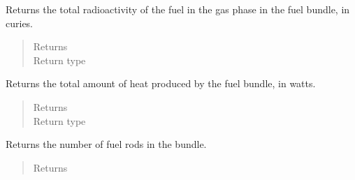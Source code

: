 \documentclass[letterpaper,10pt,openany,oneside,english]{sphinxmanual}
\begin{document}
\begin{fulllineitems}
\begin{fulllineitems}
\label{\detokenize{support_rst/fuel_bundle:fuel_bundle.FuelBundle.get_gas_radioactivity}}
Returns the total radioactivity of the fuel in the gas phase in the
fuel bundle, in curies.
\begin{quote}\begin{description}
\item[{Returns}] \leavevmode
{}

\item[{Return type}] \leavevmode
{}

\end{description}\end{quote}

\end{fulllineitems}


\begin{fulllineitems}
\label{\detokenize{support_rst/fuel_bundle:fuel_bundle.FuelBundle.get_heat_pwr}}
Returns the total amount of heat produced by the fuel bundle, in watts.
\begin{quote}\begin{description}
\item[{Returns}] \leavevmode
{}

\item[{Return type}] \leavevmode
{}

\end{description}\end{quote}

\end{fulllineitems}


\begin{fulllineitems}
\label{\detokenize{support_rst/fuel_bundle:fuel_bundle.FuelBundle.get_n_fuel_rods}}
Returns the number of fuel rods in the bundle.
\begin{quote}\begin{description}
\item[{Returns}] \leavevmode
{}


\end{description}
\end{quote}
\end{fulllineitems}
\end{fulllineitems}
\end{document}
